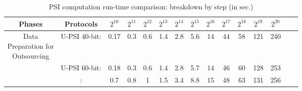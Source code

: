 \begin{table*}[!htbp]
\begin{footnotesize}
\begin{center}
\caption{ \small PSI computation run-time comparison: breakdown by step (in sec.)}\label{tbl::PSI} 


\renewcommand{\arraystretch}{1.3}

\begin{tabular}{|c|c|c|c|c|c|c|c|c|c|c|c|c|c|c} 
\hline 
\cellcolor{gray!20}\scriptsize \textbf{Phases} &\cellcolor{gray!20} \scriptsize \textbf{Protocols} &\cellcolor{gray!20} $2^{\scriptscriptstyle 10}$ &\cellcolor{gray!20}  $2^{\scriptscriptstyle 11}$&  \cellcolor{gray!20}$2^{\scriptscriptstyle 12}$&\cellcolor{gray!20}  $2^{\scriptscriptstyle 13}$&\cellcolor{gray!20} $2^{\scriptscriptstyle 14}$&\cellcolor{gray!20}   $2^{\scriptscriptstyle 15}$&\cellcolor{gray!20}  $2^{\scriptscriptstyle 16}$&\cellcolor{gray!20}   $2^{\scriptscriptstyle 17}$& \cellcolor{gray!20}  $2^{\scriptscriptstyle 18}$& \cellcolor{gray!20} $2^{\scriptscriptstyle 19}$&\cellcolor{gray!20}  $2^{\scriptscriptstyle 20}$ \\
    \hline
    
    \hline
\NameEntry{\center \scriptsize Data \\ \scriptsize Preparation for \\ \scriptsize   Outsourcing}
 \multirow{4}{*}&\cellcolor{cyan!20}  \scriptsize U-PSI 40-bit: &\cellcolor{cyan!20} 0.17&\cellcolor{cyan!20}  0.3&\cellcolor{cyan!20}  0.6&\cellcolor{cyan!20}  1.4 &\cellcolor{cyan!20}  2.8 &\cellcolor{cyan!20}  5.6  &\cellcolor{cyan!20}  14&\cellcolor{cyan!20}  44  &\cellcolor{cyan!20}  58 &\cellcolor{cyan!20}  121& \cellcolor{cyan!20} 240\\
    \cline{2-13}
 &\cellcolor{white!20}\scriptsize U-PSI 60-bit:&\cellcolor{white!20} 0.18  &\cellcolor{white!20}  0.3 &\cellcolor{white!20}  0.6&\cellcolor{white!20} 1.4  &\cellcolor{white!20} 2.8 &\cellcolor{white!20} 5.7  &\cellcolor{white!20} 14  &\cellcolor{white!20} 46 &\cellcolor{white!20} 60  &\cellcolor{white!20} 128 &\cellcolor{white!20} 253 \\ 
    \cline{2-13}
    &\cellcolor{cyan!20}\scriptsize \cite{eopsi}:&\cellcolor{cyan!20}0.7  &\cellcolor{cyan!20}0.8  &\cellcolor{cyan!20}1  &\cellcolor{cyan!20}1.5  &\cellcolor{cyan!20}3.4 &\cellcolor{cyan!20}8.8  &\cellcolor{cyan!20}15 &\cellcolor{cyan!20}48&\cellcolor{cyan!20}63 &\cellcolor{cyan!20}131 &\cellcolor{cyan!20}256   \\ 
       \hline



\end{tabular}
\end{center}
\end{footnotesize}
\end{table*}
